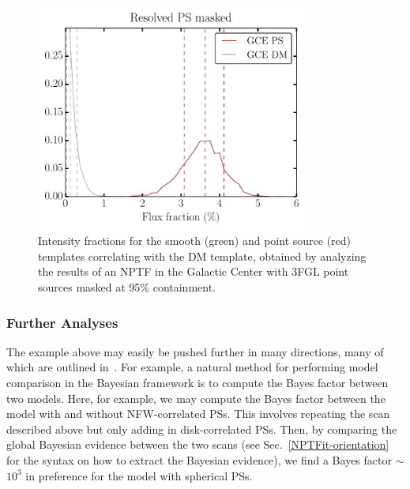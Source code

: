 \begin{figure}[htbp]
\centering
\includegraphics[width=0.8\textwidth]{ch-nptfit/gce_intensity_fraction.pdf} 
\caption{Intensity fractions for the smooth (green) and point source (red) templates correlating with the DM template, obtained by analyzing the results of an NPTF in the Galactic Center with 3FGL point sources masked at 95\% containment.}
\label{fig:gc_intensity}
\end{figure}

\subsubsection{Further Analyses}

The example above may easily be pushed further in many directions, many of which are outlined in~\cite{Lee:2015fea}.  For example, a natural method for performing model comparison in the Bayesian framework is to compute the Bayes factor between two models.  Here, for example, we may compute the Bayes factor between the model with and without NFW-correlated PSs.  This involves repeating the scan described above but only adding in disk-correlated PSs.  Then, by comparing the global Bayesian evidence between the two scans (see Sec.~\ref{NPTFit-orientation} for the syntax on how to extract the Bayesian evidence), we find a Bayes factor $\sim$$10^3$ in preference for the model with spherical PSs.

